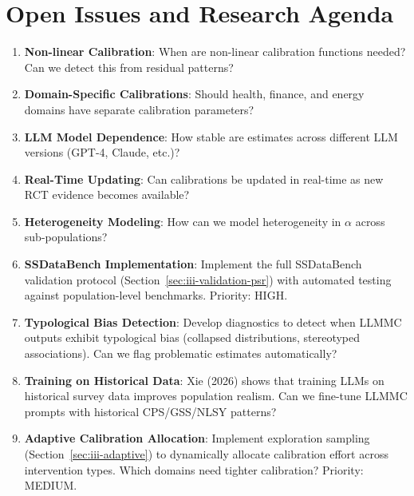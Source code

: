 
\section{Open Issues and Research Agenda}
\label{sec:iii-open-issues}

\begin{enumerate}
\item \textbf{Non-linear Calibration}: When are non-linear calibration functions
needed? Can we detect this from residual patterns?

\item \textbf{Domain-Specific Calibrations}: Should health, finance, and energy
domains have separate calibration parameters?

\item \textbf{LLM Model Dependence}: How stable are estimates across different
LLM versions (GPT-4, Claude, etc.)?

\item \textbf{Real-Time Updating}: Can calibrations be updated in real-time as
new RCT evidence becomes available?

\item \textbf{Heterogeneity Modeling}: How can we model heterogeneity in $\alpha$
across sub-populations?

\item \textbf{SSDataBench Implementation}: Implement the full SSDataBench validation
protocol (Section~\ref{sec:iii-validation-psr}) with automated testing against
population-level benchmarks. Priority: HIGH.

\item \textbf{Typological Bias Detection}: Develop diagnostics to detect when
LLMMC outputs exhibit typological bias (collapsed distributions, stereotyped
associations). Can we flag problematic estimates automatically?

\item \textbf{Training on Historical Data}: Xie (2026) shows that training LLMs
on historical survey data improves population realism. Can we fine-tune LLMMC
prompts with historical CPS/GSS/NLSY patterns?

\item \textbf{Adaptive Calibration Allocation}: Implement exploration sampling
(Section~\ref{sec:iii-adaptive}) to dynamically allocate calibration effort
across intervention types. Which domains need tighter calibration? Priority: MEDIUM.


\end{enumerate}
